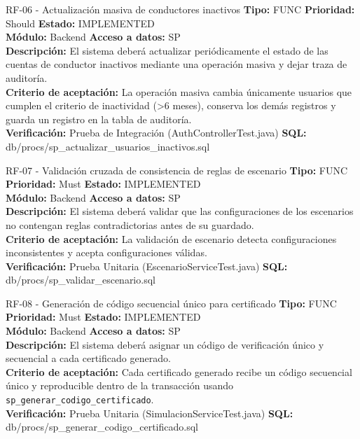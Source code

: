 \documentclass[11pt,a4paper]{article}
\begin{document}
\begin{requisito}{RF-06 - Actualización masiva de conductores inactivos}
    \textbf{Tipo:} FUNC \quad \textbf{Prioridad:} Should \quad \textbf{Estado:} IMPLEMENTED \\[0.2cm]
    \textbf{Módulo:} Backend \quad \textbf{Acceso a datos:} SP \\[0.2cm]
    \textbf{Descripción:} El sistema deberá actualizar periódicamente el estado de las cuentas de conductor inactivos mediante una operación masiva y dejar traza de auditoría. \\[0.2cm]
    \textbf{Criterio de aceptación:} La operación masiva cambia únicamente usuarios que cumplen el criterio de inactividad (>6 meses), conserva los demás registros y guarda un registro en la tabla de auditoría. \\[0.2cm]
    \textbf{Verificación:} Prueba de Integración (AuthControllerTest.java) \quad \textbf{SQL:} db/procs/sp\_actualizar\_usuarios\_inactivos.sql
\end{requisito}

\begin{requisito}{RF-07 - Validación cruzada de consistencia de reglas de escenario}
    \textbf{Tipo:} FUNC \quad \textbf{Prioridad:} Must \quad \textbf{Estado:} IMPLEMENTED \\[0.2cm]
    \textbf{Módulo:} Backend \quad \textbf{Acceso a datos:} SP \\[0.2cm]
    \textbf{Descripción:} El sistema deberá validar que las configuraciones de los escenarios no contengan reglas contradictorias antes de su guardado. \\[0.2cm]
    \textbf{Criterio de aceptación:} La validación de escenario detecta configuraciones inconsistentes y acepta configuraciones válidas. \\[0.2cm]
    \textbf{Verificación:} Prueba Unitaria (EscenarioServiceTest.java) \quad \textbf{SQL:} db/procs/sp\_validar\_escenario.sql
\end{requisito}

\begin{requisito}{RF-08 - Generación de código secuencial único para certificado}
    \textbf{Tipo:} FUNC \quad \textbf{Prioridad:} Must \quad \textbf{Estado:} IMPLEMENTED \\[0.2cm]
    \textbf{Módulo:} Backend \quad \textbf{Acceso a datos:} SP \\[0.2cm]
    \textbf{Descripción:} El sistema deberá asignar un código de verificación único y secuencial a cada certificado generado. \\[0.2cm]
    \textbf{Criterio de aceptación:} Cada certificado generado recibe un código secuencial único y reproducible dentro de la transacción usando \texttt{sp\_generar\_codigo\_certificado}. \\[0.2cm]
    \textbf{Verificación:} Prueba Unitaria (SimulacionServiceTest.java) \quad \textbf{SQL:} db/procs/sp\_generar\_codigo\_certificado.sql
\end{requisito}
\end{document}
